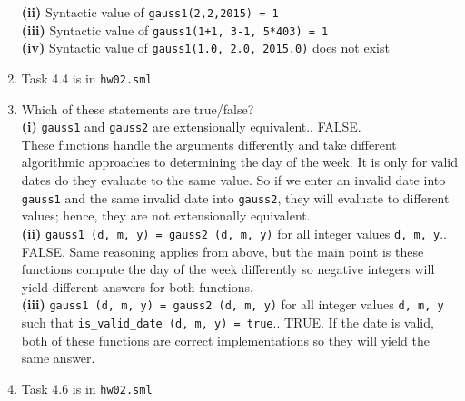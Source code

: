 \documentclass[11pt]{article}
\renewcommand{\part}[1] {\vspace{.10in} {\bf (#1)}}
\begin{document}
\begin{enumerate}
\part{ii} Syntactic value of \verb|gauss1(2,2,2015) = 1|\\
\part{iii} Syntactic value of \verb|gauss1(1+1, 3-1, 5*403) = 1|\\
\part{iv} Syntactic value of \verb|gauss1(1.0, 2.0, 2015.0)| does not exist
\item Task 4.4 is in \verb|hw02.sml|
\item Which of these statements are true/false?\\
\part{i} \verb|gauss1| and \verb|gauss2| are extensionally equivalent.. FALSE.\\These functions handle the arguments differently and take different algorithmic approaches to determining the day of the week.  It is only for valid dates do they evaluate to the same value.  So if we enter an invalid date into \verb|gauss1| and the same invalid date into \verb|gauss2|, they will evaluate to different values; hence, they are not extensionally equivalent.\\
\part{ii} \verb|gauss1 (d, m, y) = gauss2 (d, m, y)| for all integer values \verb|d, m, y|.. FALSE.  Same reasoning applies from above, but the main point is these functions compute the day of the week differently so negative integers will yield different answers for both functions.\\
\part{iii} \verb|gauss1 (d, m, y) = gauss2 (d, m, y)| for all integer values \verb|d, m, y| such that \verb|is_valid_date (d, m, y) = true|.. TRUE. If the date is valid, both of these functions are correct implementations so they will yield the same answer.
\item Task 4.6 is in \verb|hw02.sml|
\end{enumerate}
\end{document}

